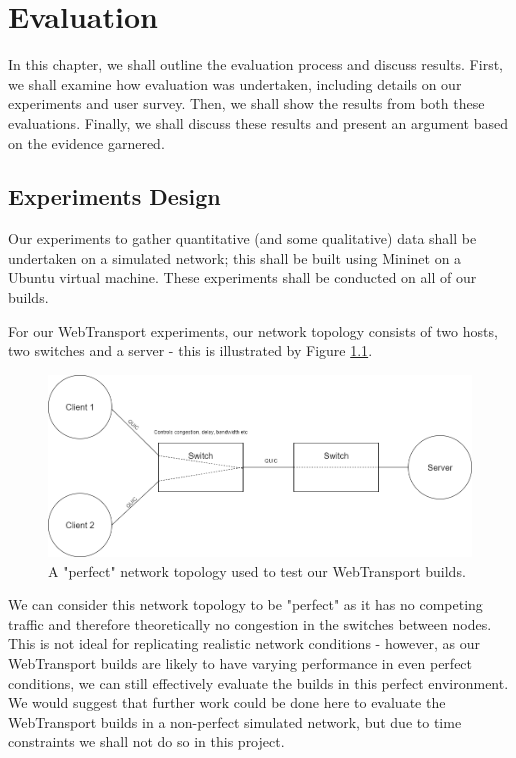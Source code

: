 
\chapter{Evaluation} 

In this chapter, we shall outline the evaluation process and discuss results. First, we shall examine how evaluation was undertaken, including details on our experiments and user survey. Then, we shall show the results from both these evaluations. Finally, we shall discuss these results and present an argument based on the evidence garnered.

\section{Experiments Design}

Our experiments to gather quantitative (and some qualitative) data shall be undertaken on a simulated network; this shall be built using Mininet on a Ubuntu virtual machine. These experiments shall be conducted on all of our builds. 

For our WebTransport experiments, our network topology consists of two hosts, two switches and a server - this is illustrated by Figure \ref{perfect-topology-wt}.

\begin{figure}[h]
    \centering
    \includegraphics[width=0.8\columnwidth]{images/perfect-topology.png}
	\caption{A "perfect" network topology used to test our WebTransport builds.}
    \label{perfect-topology-wt}
\end{figure}

We can consider this network topology to be "perfect" as it has no competing traffic and therefore theoretically no congestion in the switches between nodes. This is not ideal for replicating realistic network conditions - however, as our WebTransport builds are likely to have varying performance in even perfect conditions, we can still effectively evaluate the builds in this perfect environment. We would suggest that further work could be done here to evaluate the WebTransport builds in a non-perfect simulated network, but due to time constraints we shall not do so in this project.

